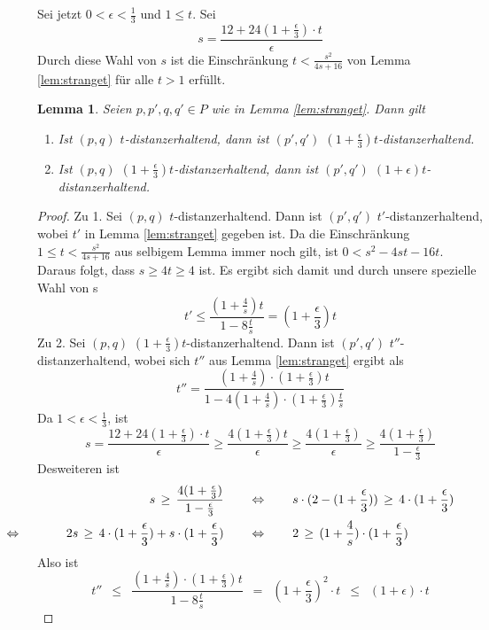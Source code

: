 \documentclass[11pt]{article}
\newtheorem{lemma}[theorem]{Lemma}
\begin{document}
    Sei jetzt $0 < \epsilon < \frac{1}{3}$ und $1 \leq t$. Sei 
    \[s = \frac{12 + 24(1 + \frac{\epsilon}{3})\cdot t}{\epsilon}\]
    Durch diese Wahl von $s$ ist die Einschränkung $t < \frac{s^2}{4s + 16}$ von Lemma \ref{lem:stranget} für alle $t > 1$ erfüllt.
    
    \begin{lemma}
    	\label{lem:tepsilon}
    	Seien $p, p', q, q' \in P$ wie in Lemma \ref{lem:stranget}. Dann gilt
    	\begin{enumerate}
    		\item Ist $(p, q)$ $t$-distanzerhaltend, dann ist $(p', q')$ $(1 + \frac{\epsilon}{3})t$-distanzerhaltend.
    		\item Ist $(p, q)$ $(1 + \frac{\epsilon}{3})t$-distanzerhaltend, dann ist $(p', q')$ $(1 + \epsilon)t$-distanzerhaltend.
    	\end{enumerate}
    \end{lemma}
    \begin{proof}
    	Zu 1. Sei $(p, q)$ $t$-distanzerhaltend. Dann ist $(p', q')$ $t'$-distanzerhaltend, wobei $t'$ in Lemma \ref{lem:stranget} gegeben ist. Da die Einschränkung $1 \leq t < \frac{s^2}{4s + 16}$ aus selbigem Lemma immer noch gilt, ist $0 < s^2 - 4st - 16t$. Daraus folgt, dass $s \geq 4t \geq 4$ ist. Es ergibt sich damit und durch unsere spezielle Wahl von s 
    	\[t' \leq \frac{(1 + \frac{4}{s})t}{1 - 8 \frac{t}{s}} = (1+ \frac{\epsilon}{3})t\]
    	Zu 2. Sei $(p, q)$ $(1+ \frac{\epsilon}{3})t$-distanzerhaltend. Dann ist $(p', q')$ $t''$-distanzerhaltend, wobei sich $t''$ aus Lemma \ref{lem:stranget} ergibt als 
    	\[t'' = \frac{(1+\frac{4}{s})\cdot (1 + \frac{\epsilon}{3})t}{1 - 4(1 + \frac{4}{s})\cdot (1 + \frac{\epsilon}{3})\frac{t}{s}}\]
    	Da $1 < \epsilon < \frac{1}{3}$, ist
    	\[
	    	s = \frac{12 + 24(1 + \frac{\epsilon}{3})\cdot t}{\epsilon} \geq \frac{4 (1 + \frac{\epsilon}{3})t}{\epsilon}
    		\geq\frac{4 (1 + \frac{\epsilon}{3})}{\epsilon}
    		\geq\frac{4 (1 + \frac{\epsilon}{3})}{1 - \frac{\epsilon}{3}}
    		\]
    	Desweiteren ist 
    	\begin{align*}    	
	    	s\,\geq\,\frac{4 (1 + \frac{\epsilon}{3})}{1 - \frac{\epsilon}{3}}\qquad
	    	&\Leftrightarrow \qquad s \cdot (2 - (1 + \frac{\epsilon}{3}))\,\geq\, 4 \cdot(1 + \frac{\epsilon}{3})
	    	\\2s \,\geq\, 4 \cdot(1 + \frac{\epsilon}{3}) + s \cdot (1 + \frac{\epsilon}{3}) \qquad
	    	&\Leftrightarrow \qquad 2 \,\geq\, (1 + \frac{4}{s})\cdot(1 + \frac{\epsilon}{3})
	    	\tag*{\llap{\makebox[\linewidth][l]{$\Leftrightarrow$}}}
    	\end{align*}
    	Also ist 
    	\[
	    	t'' \enspace\leq\enspace \frac{(1 + \frac{4}{s})\cdot (1 + \frac{\epsilon}{3})t}{1 - 8 \frac{t}{s}}
	    	\enspace=\enspace (1 + \frac{\epsilon}{3})^2\cdot t \enspace\leq\enspace (1 + \epsilon)\cdot t
    	\]
    \end{proof}
\end{document}
